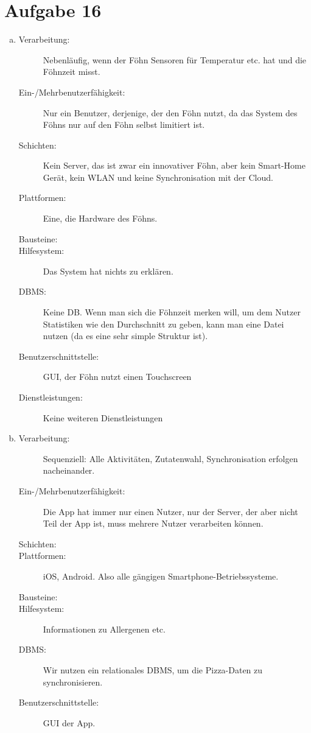 \section*{Aufgabe 16}
\begin{enumerate} [a)]
	\item 
	\begin{description}
		\item[Verarbeitung:] Nebenläufig, wenn der Föhn Sensoren für Temperatur etc. hat und die Föhnzeit misst.
		\item[Ein-/Mehrbenutzerfähigkeit:] Nur ein Benutzer, derjenige, der den Föhn nutzt, da das System des Föhns nur auf den Föhn selbst limitiert ist.
		\item[Schichten:] Kein Server, das ist zwar ein innovativer Föhn, aber kein Smart-Home Gerät, kein WLAN und keine Synchronisation mit der Cloud.
		\item[Plattformen:] Eine, die Hardware des Föhns.
		\item[Bausteine:] 
		\item[Hilfesystem:] Das System hat nichts zu erklären.
		\item[DBMS:] Keine DB. Wenn man sich die Föhnzeit merken will, um dem Nutzer Statistiken wie den Durchschnitt zu geben, kann man eine Datei nutzen (da es eine sehr simple Struktur ist).
		\item[Benutzerschnittstelle:] GUI, der Föhn nutzt einen Touchscreen
		\item[Dienstleistungen:] Keine weiteren Dienstleistungen
	\end{description}
	\item 
		\begin{description}
		\item[Verarbeitung:] Sequenziell: Alle Aktivitäten, Zutatenwahl, Synchronisation erfolgen nacheinander.
		\item[Ein-/Mehrbenutzerfähigkeit:] Die App hat immer nur einen Nutzer, nur der Server, der aber nicht Teil der App ist, muss mehrere Nutzer verarbeiten können.
		\item[Schichten:]
		\item[Plattformen:] iOS, Android. Also alle gängigen Smartphone-Betriebssysteme.
		\item[Bausteine:]
		\item[Hilfesystem:] Informationen zu Allergenen etc.
		\item[DBMS:] Wir nutzen ein relationales DBMS, um die Pizza-Daten zu synchronisieren.
		\item [Benutzerschnittstelle:] GUI der App.

\end{description}
\end{enumerate}
